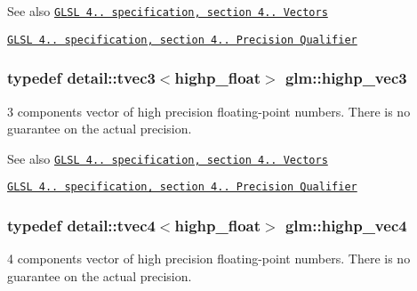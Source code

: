 \begin{DoxySeeAlso}{\-See also}
\href{http://www.opengl.org/registry/doc/GLSLangSpec.4.20.8.pdf}{\tt \-G\-L\-S\-L 4.. specification, section 4.. \-Vectors} 

\href{http://www.opengl.org/registry/doc/GLSLangSpec.4.20.8.pdf}{\tt \-G\-L\-S\-L 4.. specification, section 4.. \-Precision \-Qualifier} 
\end{DoxySeeAlso}
\hypertarget{group__core__precision_gab660f8916a9c4a72bf71cd4279ae19fb}{
\subsubsection[{highp\-\_\-vec3}]{\setlength{\rightskip}{0pt plus 5cm}typedef detail\-::tvec3$<$highp\-\_\-float$>$ {\bf glm\-::highp\-\_\-vec3}}}\label{group__core__precision_gab660f8916a9c4a72bf71cd4279ae19fb}
3 components vector of high precision floating-\/point numbers. \-There is no guarantee on the actual precision.

\begin{DoxySeeAlso}{\-See also}
\href{http://www.opengl.org/registry/doc/GLSLangSpec.4.20.8.pdf}{\tt \-G\-L\-S\-L 4.. specification, section 4.. \-Vectors} 

\href{http://www.opengl.org/registry/doc/GLSLangSpec.4.20.8.pdf}{\tt \-G\-L\-S\-L 4.. specification, section 4.. \-Precision \-Qualifier} 
\end{DoxySeeAlso}
\hypertarget{group__core__precision_ga78dab0bca921cd9a1e1206ee3cf01207}{
\subsubsection[{highp\-\_\-vec4}]{\setlength{\rightskip}{0pt plus 5cm}typedef detail\-::tvec4$<$highp\-\_\-float$>$ {\bf glm\-::highp\-\_\-vec4}}}\label{group__core__precision_ga78dab0bca921cd9a1e1206ee3cf01207}
4 components vector of high precision floating-\/point numbers. \-There is no guarantee on the actual precision.

